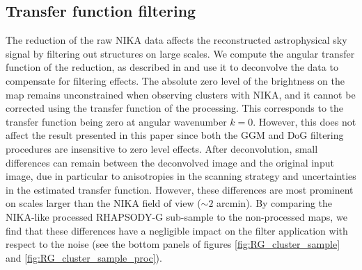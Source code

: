 \documentclass[twocolumn,traditabstract]{aa}
\begin{document}
\subsection{Transfer function filtering}\label{sec:Transfer_function_filtering}
The reduction of the raw NIKA data affects the reconstructed astrophysical sky signal by filtering out structures on large scales. We compute the angular transfer function of the reduction, as described in \cite{Adam2015} and use it to deconvolve the data to compensate for filtering effects. The absolute zero level of the brightness on the map remains unconstrained when observing clusters with NIKA, and it cannot be corrected using the transfer function of the processing. This corresponds to the transfer function being zero at angular wavenumber $k = 0$. However, this does not affect the result presented in this paper since both the GGM and DoG filtering procedures are insensitive to zero level effects. After deconvolution, small differences can remain between the deconvolved image and the original input image, due in particular to anisotropies in the scanning strategy and uncertainties in the estimated transfer function. However, these differences are most prominent on scales larger than the NIKA field of view ($\sim 2$ arcmin). By comparing the NIKA-like processed RHAPSODY-G sub-sample to the non-processed maps, we find that these differences have a negligible impact on the filter application with respect to the noise (see the bottom panels of figures \ref{fig:RG_cluster_sample} and \ref{fig:RG_cluster_sample_proc}).

\end{document}
